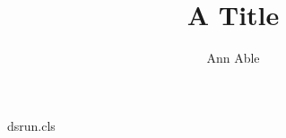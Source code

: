 \begin{filecontents*}[overwrite]{dsrun.cls}
\newcommand{\address}[1]{\gdef\ds@address{#1\relax}}
\let\ds@address\empty
\def\@maketitle{\begin{center}{\LARGE\@title\par}\vskip1em{\large\@author\par}\end{center}%
  \markright{\ds@address}}
\pagestyle{myheadings}
\end{filecontents*}
\documentclass{dsrun}

\title{A Title}
\author{Ann Able}
\address{Univ A, Town}
\maketitle
Text.

